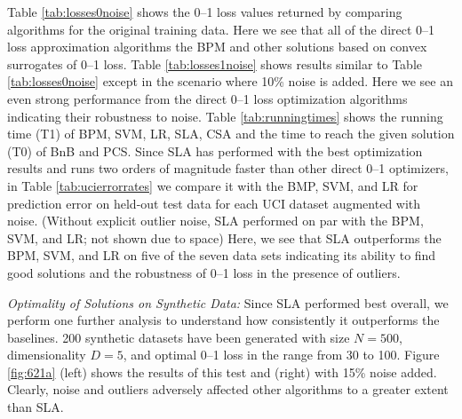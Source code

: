 Table \ref{tab:losses0noise} shows the 0--1 loss values returned by
comparing algorithms for the original training data.  Here we see that all of the
direct 0--1 loss approximation algorithms the BPM and other solutions
based on convex surrogates of 0--1 loss.
Table \ref{tab:losses1noise} shows results similar to
Table \ref{tab:losses0noise} except in the scenario where 
10\% noise is added.  Here we see an even strong performance from the
direct 0--1 loss optimization algorithms indicating their robustness
to noise.
Table \ref{tab:runningtimes} shows the running time (T1) of BPM, SVM,
LR, SLA, CSA and the time to reach the given solution (T0) of BnB and
PCS.
Since SLA has performed with the best optimization results and runs two
orders of magnitude faster than other direct 0--1 optimizers,
in Table \ref{tab:ucierrorrates} we compare it with the BMP, SVM, and
LR for prediction error on held-out test data for each UCI dataset
augmented with noise.  (Without explicit outlier noise, SLA performed
on par with the BPM, SVM, and LR; not shown due to space)  
Here, we see that SLA outperforms
the BPM, SVM, and LR on five of the seven data sets indicating its
ability to find good solutions and the robustness of 0--1 loss in the
presence of outliers.

\noindent\emph{Optimality of Solutions on Synthetic Data: } Since SLA
performed best overall, we perform one further analysis to understand
how consistently it outperforms the baselines.  200 synthetic 
datasets have been generated with size $N=500$,
dimensionality $D=5$, and optimal 0--1 loss in the range from 30 to
100. Figure \ref{fig:621a} (left) shows the results of this test and
(right) with 15\% noise added.  Clearly, noise and outliers
adversely affected other algorithms to a greater extent than SLA.

